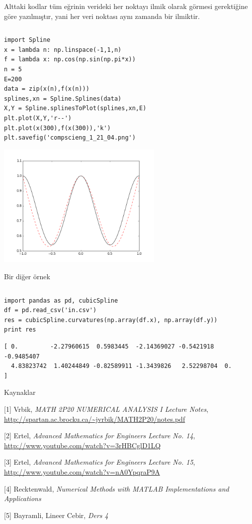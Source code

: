 \documentclass[12pt,fleqn]{article}\usepackage{../../common}
\begin{document}
Alttaki kodlar tüm eğrinin verideki her noktayı ilmik olarak görmesi
gerektiğine göre yazılmıştır, yani her veri noktası aynı zamanda bir
ilmiktir.

\inputminted[fontsize=\footnotesize]{python}{Spline.py}

\begin{verbatim}
import Spline
x = lambda n: np.linspace(-1,1,n)
f = lambda x: np.cos(np.sin(np.pi*x))
n = 5
E=200
data = zip(x(n),f(x(n)))
splines,xn = Spline.Splines(data)
X,Y = Spline.splinesToPlot(splines,xn,E)
plt.plot(X,Y,'r--')
plt.plot(x(300),f(x(300)),'k')
plt.savefig('compscieng_1_21_04.png')
\end{verbatim}

\includegraphics[height=6cm]{compscieng_1_21_04.png}

Bir diğer örnek

\inputminted[fontsize=\footnotesize]{python}{cubicSpline.py}

\begin{verbatim}
import pandas as pd, cubicSpline
df = pd.read_csv('in.csv')
res = cubicSpline.curvatures(np.array(df.x), np.array(df.y))
print res
\end{verbatim}

\begin{verbatim}
[ 0.         -2.27960615  0.5983445  -2.14369027 -0.5421918  -0.9485407
  4.83823742  1.40244849 -0.82589911 -1.3439826   2.52298704  0.        ]
\end{verbatim}

Kaynaklar

[1] Vrbik, {\em MATH 2P20 NUMERICAL ANALYSIS I Lecture Notes}, \url{http://spartan.ac.brocku.ca/~jvrbik/MATH2P20/notes.pdf}

[2] Ertel, {\em Advanced Mathematics for Engineers Lecture No. 14}, \url{http://www.youtube.com/watch?v=3rHBCglD1LQ}

[3] Ertel, {\em Advanced Mathematics for Engineers Lecture No. 15}, \url{http://www.youtube.com/watch?v=nA0YpqraP9A}

[4] Recktenwald, {\em Numerical Methods with MATLAB Implementations and Applications}

[5] Bayramli, Lineer Cebir, {\em Ders 4}
\end{document}
